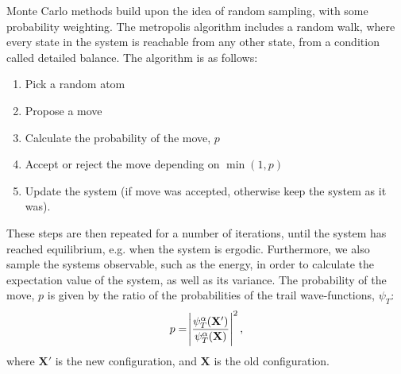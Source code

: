 \documentclass[a4paper]{article}
\newcommand{\newparagraph}{\vspace{.5cm}\noindent}
\begin{document}
\newparagraph
Monte Carlo methods build upon the idea of random sampling, with some probability weighting.
The metropolis algorithm includes a random walk, where every state in the system is reachable from any other state, from a condition called detailed balance.
The algorithm is as follows:
\begin{enumerate}
    \item Pick a random atom
    \item Propose a move
    \item Calculate the probability of the move, $p$ 
    \item Accept or reject the move depending on $\min\left(1, p\right)$
    \item Update the system (if move was accepted, otherwise keep the system as it was).
\end{enumerate}These steps are then repeated for a number of iterations, until the system has reached equilibrium, e.g. when the system is ergodic.
Furthermore, we also sample the systems observable, such as the energy, in order to calculate the expectation value of the system, as well as its variance.
The probability of the move, $p$ is given by the ratio of the probabilities of the trail wave-functions, $\psi_T$:
\begin{align}
    p = \abs{\frac{\psi_T^\alpha(\mathbf{X}')}{\psi_T^{\alpha}(\mathbf{X})}}^2,\label{eq: probability of move}
\end{align}where $\mathbf{X}'$ is the new configuration, and $\mathbf{X}$ is the old configuration.
\end{document}
